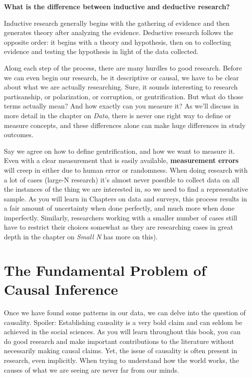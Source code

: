 \documentclass{book}
\newenvironment{shaded*}{
    \begin{center}
    \begin{tabular}{|p{0.9\textwidth}|}
    \hline\\
    }
    { 
    \\\\\hline
    \end{tabular} 
    \end{center}
}
\begin{document}
\textbf{What is the difference between inductive and deductive research?}

\begin{shaded*}

Inductive research generally begins with the gathering of evidence and then
generates theory after analyzing the evidence. Deductive research follows the
opposite order: it begins with a theory and hypothesis, then on to collecting
evidence and testing the hypothesis in light of the data collected.

\end{shaded*}

Along each step of the process, there are many hurdles to good research.
Before we can even begin our research, be it descriptive or causal, we have to
be clear about what we are actually researching. Sure, it sounds interesting
to research partisanship, or polarization, or corruption, or gentrification.
But what do those terms actually mean? And how exactly can you measure it? As
we'll discuss in more detail in the chapter on \emph{Data}, there is never one
right way to define or measure concepts, and these differences alone can make
huge differences in study outcomes.

Say we agree on how to define gentrification, and how we want to measure it.
Even with a clear measurement that is easily available, \textbf{measurement
errors} will creep in either due to human error or randomness. When doing
research with a lot of cases (large-N research) it's almost never possible to
collect data on all the instances of the thing we are interested in, so we
need to find a representative sample. As you will learn in Chapters on data
and surveys, this process results in a fair amount of uncertainty when done
perfectly, and much more when done imperfectly. Similarly, researchers working
with a smaller number of cases still have to restrict their choices somewhat
as they are researching cases in great depth in the chapter on \emph{Small N}
has more on this).

\hypertarget{the-fundamental-problem-of-causal-inference}{%
\section{The Fundamental Problem of Causal
Inference}\label{the-fundamental-problem-of-causal-inference}}

Once we have found some patterns in our data, we can delve into the question
of causality. Spoiler: Establishing causality is a very bold claim and can
seldom be achieved in the social sciences. As you will learn throughout this
book, you can do good research and make important contributions to the
literature without necessarily making causal claims. Yet, the issue of
causality is often present in research, even implicitly. When trying to
understand how the world works, the causes of what we are seeing are never far
from our minds.
\end{document}
